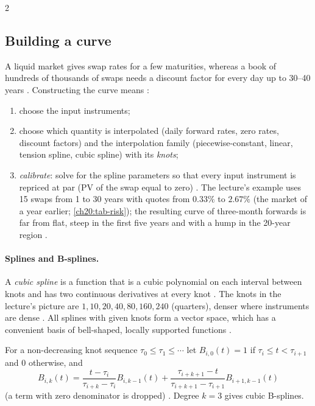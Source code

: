 \begin{paracol}{2}
\subsection{Building a curve}\label{ch20:sec-build}
A liquid market gives swap rates for a few maturities, whereas a book of hundreds of thousands of swaps needs a discount factor for every day up to 30--40 years
. Constructing the curve means :
\begin{enumerate}[1.]
  \item choose the input instruments;
  \item choose
      which quantity is interpolated (daily forward rates, zero rates, discount factors) and the interpolation family
      (piecewise-constant, linear, tension spline, cubic spline) with its \emph{knots};
  \item \emph{calibrate}: solve for the
      spline parameters so that every input instrument is repriced at par (PV of the swap equal to zero)
      . The lecture's example uses 15 swaps from 1 to 30 years with quotes from $0.33\%$ to $2.67\%$
      (the market of a year earlier; \cref{ch20:tab-risk}); the resulting curve of three-month forwards is far from flat, steep in the first five years
      and with a hump in the 20-year region .
\end{enumerate}

\paragraph{Splines and B-splines.}
A \emph{cubic spline} is a function that is a cubic polynomial on each interval between knots and has two continuous derivatives at every knot .
The knots in the lecture's picture are $1,10,20,40,80,160,240$ (quarters), denser where instruments are dense
. All splines with given knots form a vector space, which has a convenient basis of bell-shaped,
locally supported functions .

\begin{definition}\label{ch20:def-bspline}
For a non-decreasing knot sequence $\tau_0\le\tau_1\le\cdots$ let $B_{i,0}(t)=1$ if $\tau_i\le t<\tau_{i+1}$ and $0$ otherwise, and
\[
  B_{i,k}(t)=\frac{t-\tau_i}{\tau_{i+k}-\tau_i}B_{i,k-1}(t)+\frac{\tau_{i+k+1}-t}{\tau_{i+k+1}-\tau_{i+1}}B_{i+1,k-1}(t)
\]
(a term with zero denominator is dropped) . Degree $k=3$ gives cubic B-splines.
\end{definition}


\end{paracol}
